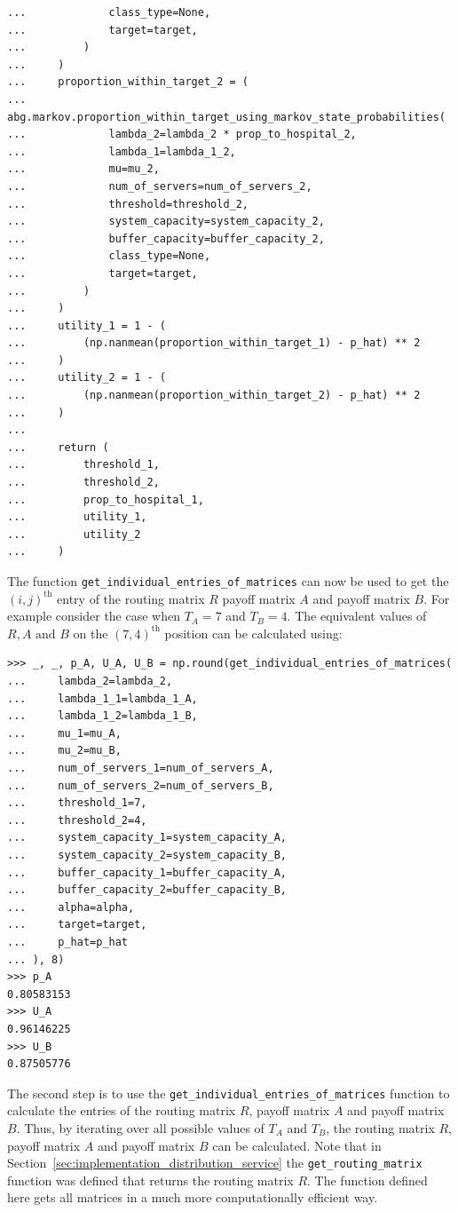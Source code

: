 \begin{lstlisting}[style=pystyle]
...             class_type=None,
...             target=target,
...         )
...     )
...     proportion_within_target_2 = (
...         abg.markov.proportion_within_target_using_markov_state_probabilities(
...             lambda_2=lambda_2 * prop_to_hospital_2,
...             lambda_1=lambda_1_2,
...             mu=mu_2,
...             num_of_servers=num_of_servers_2,
...             threshold=threshold_2,
...             system_capacity=system_capacity_2,
...             buffer_capacity=buffer_capacity_2,
...             class_type=None,
...             target=target,
...         )
...     )
...     utility_1 = 1 - (
...         (np.nanmean(proportion_within_target_1) - p_hat) ** 2
...     )
...     utility_2 = 1 - (
...         (np.nanmean(proportion_within_target_2) - p_hat) ** 2
...     )
... 
...     return (
...         threshold_1,    
...         threshold_2,
...         prop_to_hospital_1,
...         utility_1,
...         utility_2
...     )

\end{lstlisting}

The function \lstinline[style=pystyle]{get_individual_entries_of_matrices} can
now be used to get the \((i,j)^\text{th}\) entry of the routing matrix \(R\)
payoff matrix \(A\) and payoff matrix \(B\).
For example consider the case when \(T_A = 7\) and \(T_B = 4\).
The equivalent values of \(R, A \text{ and } B\) on the \((7, 4)^\text{th}\)
position can be calculated using:

\begin{lstlisting}[style=pystyle]
>>> _, _, p_A, U_A, U_B = np.round(get_individual_entries_of_matrices(
...     lambda_2=lambda_2,
...     lambda_1_1=lambda_1_A,
...     lambda_1_2=lambda_1_B,
...     mu_1=mu_A,
...     mu_2=mu_B,
...     num_of_servers_1=num_of_servers_A,
...     num_of_servers_2=num_of_servers_B,
...     threshold_1=7,
...     threshold_2=4,
...     system_capacity_1=system_capacity_A,
...     system_capacity_2=system_capacity_B,
...     buffer_capacity_1=buffer_capacity_A,
...     buffer_capacity_2=buffer_capacity_B,
...     alpha=alpha,
...     target=target,
...     p_hat=p_hat
... ), 8)
>>> p_A
0.80583153
>>> U_A
0.96146225
>>> U_B
0.87505776

\end{lstlisting}

The second step is to use the
\lstinline[style=pystyle]{get_individual_entries_of_matrices} function to
calculate the entries of the routing matrix \(R\), payoff matrix \(A\) and
payoff matrix \(B\).
Thus, by iterating over all possible values of \(T_A\) and \(T_B\), the
routing matrix \(R\), payoff matrix \(A\) and payoff matrix \(B\) can be
calculated.
Note that in Section~\ref{sec:implementation_distribution_service} the
\lstinline[style=pystyle]{get_routing_matrix} function was defined that returns
the routing matrix \(R\).
The function defined here gets all matrices in a much more computationally
efficient way.

